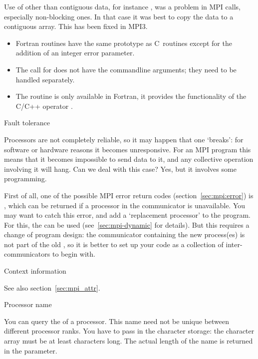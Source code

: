 Use of other than contiguous data, for instance , was a
problem in MPI calls, especially non-blocking ones. In that case it
was best to copy the data to a contiguous array. This has been fixed
in MPI3.

\begin{itemize}
\item Fortran routines have the same prototype as C~routines except for the addition
  of an integer error parameter.
\item The call for  does not have the commandline arguments;
  they need to be handled separately.
\item The routine  is only available in Fortran, it provides the 
  functionality of the C/C++ operator .
\end{itemize}


 {Fault tolerance}
\label{mpi:tolerant}

Processors are not completely reliable, so it may happen that one
`breaks': for software or hardware reasons it becomes
unresponsive. For an MPI program this means that it becomes impossible
to send data to it, and any collective operation involving it will
hang. Can we deal with this case? Yes, but it involves some
programming.

First of all, one of the possible MPI error return codes
(section~\ref{sec:mpi:error}) is , which can be returned
if a processor in the communicator is unavailable. You may want to
catch this error, and add a `replacement processor' to the
program. For this, the  can be used
(see~\ref{sec:mpi-dynamic} for details).
%
But this requires a change of program design: the communicator
containing the new process(es) is not part of the
old , so it is better to set up your code as a
collection of inter-communicators to begin with.

 {Context information}
\label{sec:context}

See also section~\ref{sec:mpi_attr}.

 {Processor name}

You can query the  of a processor.
This name need not be unique between different processor ranks.
%
%
You have to pass in the character storage:
the character array must be at least  characters long.
The actual length of the name is returned in the  parameter.

